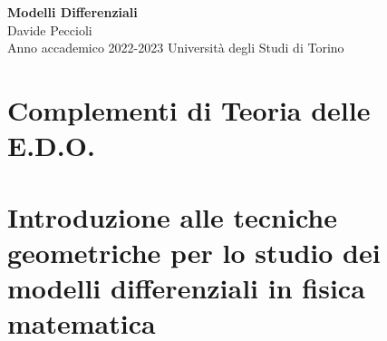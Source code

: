 \documentclass[11pt, titlepage, twoside, a4paper]{book}
\begin{document}
\frontmatter

\begin{titlepage}
\null
\vfill
\begin{center}
{\Huge \textbf{Modelli Differenziali}}\\
\vspace{1em}
{\large Davide Peccioli}\\
\vspace{0.6em}
{\large Anno accademico 2022-2023}
\vfill
Università degli Studi di Torino
\end{center}
\end{titlepage}
{\pagestyle{empty}
\null\cleardoublepage}


\fancyhead{} %
\fancyfoot{}
\fancyfoot[C]{\thepage}
\renewcommand{\headrulewidth}{0.4pt}
\renewcommand{\footrulewidth}{0pt}
\pagestyle{fancy}

\tableofcontents\cleardoublepage


\mainmatter

\part{Complementi di Teoria delle E.D.O.}


\part{Introduzione alle tecniche geometriche per lo studio dei modelli differenziali in fisica matematica}







\backmatter

\cleardoublepage\normalem
\printbibliography
\end{document}

